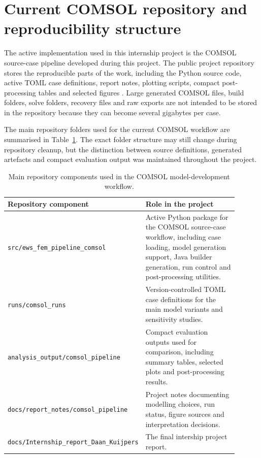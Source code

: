 \newpage
\section{Current COMSOL repository and reproducibility structure}
\label{sec:appendix_current_repository}

The active implementation used in this internship project is the COMSOL source-case pipeline developed during this project. The public project repository stores the reproducible parts of the work, including the Python source code, active TOML case definitions, report notes, plotting scripts, compact post-processing tables and selected figures \cite{KuijpersEWSComsolGitHub}. Large generated COMSOL files, build folders, solve folders, recovery files and raw exports are not intended to be stored in the repository because they can become several gigabytes per case.

The main repository folders used for the current COMSOL workflow are summarised in Table~\ref{tab:appendix_repository_structure}. The exact folder structure may still change during repository cleanup, but the distinction between source definitions, generated artefacts and compact evaluation output was maintained throughout the project.

\begin{table}[H]
\centering
\caption{Main repository components used in the COMSOL model-development workflow.}
\label{tab:appendix_repository_structure}
\begin{tabular}{p{0.40\linewidth} p{0.50\linewidth}}
\toprule
Repository component & Role in the project \\
\midrule
\texttt{src/ews\_fem\_pipeline\_comsol} & Active Python package for the COMSOL source-case workflow, including case loading, model generation support, Java builder generation, run control and post-processing utilities. \\
\texttt{runs/comsol\_runs} & Version-controlled TOML case definitions for the main model variants and sensitivity studies. \\
\texttt{analysis\_output/comsol\_pipeline} & Compact evaluation outputs used for comparison, including summary tables, selected plots and post-processing results. \\
\texttt{docs/report\_notes/comsol\_pipeline} & Project notes documenting modelling choices, run status, figure sources and interpretation decisions. \\
\texttt{docs/Internship\_report\_Daan\_Kuijpers} & The final intership project report. \\
\bottomrule
\end{tabular}
\end{table}


